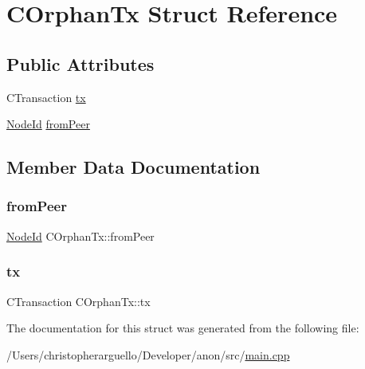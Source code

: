 \hypertarget{struct_c_orphan_tx}{}\section{C\+Orphan\+Tx Struct Reference}
\label{struct_c_orphan_tx}
\subsection*{Public Attributes}
\begin{DoxyCompactItemize}
\item 
C\+Transaction \mbox{\hyperlink{struct_c_orphan_tx_aa797568f3a1168e96d3c51601eda5fdc}{tx}}
\item 
\mbox{\hyperlink{net_8h_a954d746a58632565552615fd0a4ee660}{Node\+Id}} \mbox{\hyperlink{struct_c_orphan_tx_a06fa313a474fd4e6d0ed20bda7cbe69c}{from\+Peer}}
\end{DoxyCompactItemize}


\subsection{Member Data Documentation}
\mbox{\label{struct_c_orphan_tx_a06fa313a474fd4e6d0ed20bda7cbe69c}} 
\subsubsection{\texorpdfstring{from\+Peer}{fromPeer}}
{\footnotesize\ttfamily \mbox{\hyperlink{net_8h_a954d746a58632565552615fd0a4ee660}{Node\+Id}} C\+Orphan\+Tx\+::from\+Peer}

\mbox{\label{struct_c_orphan_tx_aa797568f3a1168e96d3c51601eda5fdc}} 
\subsubsection{\texorpdfstring{tx}{tx}}
{\footnotesize\ttfamily C\+Transaction C\+Orphan\+Tx\+::tx}



The documentation for this struct was generated from the following file\+:\begin{DoxyCompactItemize}
\item 
/\+Users/christopherarguello/\+Developer/anon/src/\mbox{\hyperlink{main_8cpp}{main.\+cpp}}\end{DoxyCompactItemize}

